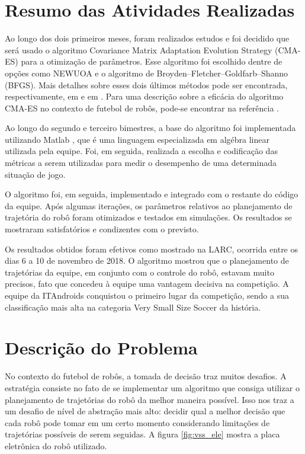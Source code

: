 \documentclass[a4paper,12pt]{article}
\begin{document}
\section{Resumo das Atividades Realizadas}
\label{secao:atividades_realizadas}

Ao longo dos dois primeiros meses, foram realizados estudos e foi decidido que será usado o algoritmo Covariance Matrix Adaptation Evolution Strategy (CMA-ES) para a otimização de parâmetros. Esse algoritmo foi escolhido dentre de opções como NEWUOA e o algoritmo de Broyden–Fletcher–Goldfarb–Shanno (BFGS). Mais detalhes sobre esses dois últimos métodos pode ser encontrada, respectivamente, em \cite{NEWUOA} e em \cite{BFGS}. Para uma descrição sobre a eficácia do algoritmo CMA-ES no contexto de futebol de robôs, pode-se encontrar na referência \cite{CMA-ES}.

Ao longo do segundo e terceiro bimestres, a base do algoritmo foi implementada utilizando Matlab \cite{matlab}, que é uma linguagem especializada em algébra linear utilizada pela equipe. Foi, em seguida, realizada a escolha e codificação das métricas a serem utilizadas para medir o desempenho de uma determinada situação de jogo.

O algoritmo foi, em seguida, implementado e integrado com o restante do código da equipe. Após algumas iterações, os parâmetros relativos ao planejamento de trajetória do robô foram otimizados e testados em simulações. Os resultados se mostraram satisfatórios e condizentes com o previsto.

Os resultados obtidos foram efetivos como mostrado na LARC, ocorrida entre os dias 6 a 10 de novembro de 2018. O algoritmo mostrou que o planejamento de trajetórias da equipe, em conjunto com o controle do robô, estavam muito precisos, fato que concedeu à equipe uma vantagem decisiva na competição. A equipe da ITAndroids conquistou o primeiro lugar da competição, sendo a sua classificação mais alta na categoria Very Small Size Soccer da história.

\section{Descrição do Problema}
\label{secao:enunciado_problema}

No contexto do futebol de robôs, a tomada de decisão traz muitos desafios. A estratégia consiste no fato de se implementar um algoritmo que consiga utilizar o planejamento de trajetórias do robô da melhor maneira possível. Isso nos traz a um desafio de nível de abstração mais alto: decidir qual a melhor decisão que cada robô pode tomar em um certo momento considerando limitações de trajetórias possíveis de serem seguidas. A figura \ref{fig:vss_ele} mostra a placa eletrônica do robô utilizado. 
\end{document}
